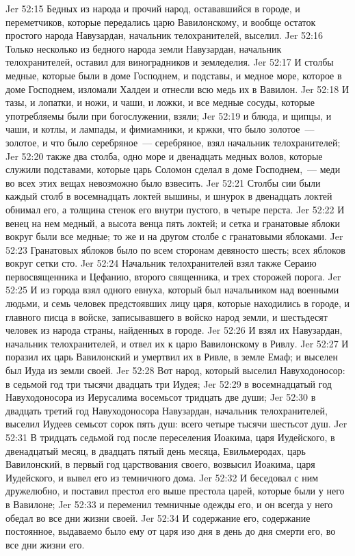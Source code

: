 \vs Jer 52:15 Бедных из народа и прочий народ, остававшийся в городе, и переметчиков, которые передались царю Вавилонскому, и вообще остаток простого народа Навузардан, начальник телохранителей, выселил.
\vs Jer 52:16 Только несколько из бедного народа земли Навузардан, начальник телохранителей, оставил для виноградников и земледелия.
\vs Jer 52:17 И столбы медные, которые были в доме Господнем, и подставы, и медное море, которое в доме Господнем, изломали Халдеи и отнесли всю медь их в Вавилон.
\vs Jer 52:18 И тазы, и лопатки, и ножи, и чаши, и ложки, и все медные сосуды, которые употребляемы были при богослужении, взяли;
\vs Jer 52:19 и блюда, и щипцы, и чаши, и котлы, и лампады, и фимиамники, и кржки, что было золотое~--- золотое, и что было серебряное~--- серебряное, взял начальник телохранителей;
\vs Jer 52:20 также два столба, одно море и двенадцать медных волов, которые служили подставами, которые царь Соломон сделал в доме Господнем,~--- меди во всех этих вещах невозможно было взвесить.
\vs Jer 52:21 Столбы сии были каждый столб в восемнадцать локтей вышины, и шнурок в двенадцать локтей обнимал его, а толщина стенок его внутри пустого, в четыре перста.
\vs Jer 52:22 И венец на нем медный, а высота венца пять локтей; и сетка и гранатовые яблоки вокруг были все медные; то же и на другом столбе с гранатовыми яблоками.
\vs Jer 52:23 Гранатовых яблоков было по всем сторонам девяносто шесть; всех яблоков вокруг сетки сто.
\vs Jer 52:24 Начальник телохранителей взял также Сераию первосвященника и Цефанию, второго священника, и трех сторожей порога.
\vs Jer 52:25 И из города взял одного евнуха, который был начальником над военными людьми, и семь человек предстоявших лицу царя, которые находились в городе, и главного писца в войске, записывавшего в войско народ земли, и шестьдесят человек из народа страны, найденных в городе.
\vs Jer 52:26 И взял их Навузардан, начальник телохранителей, и отвел их к царю Вавилонскому в Ривлу.
\vs Jer 52:27 И поразил их царь Вавилонский и умертвил их в Ривле, в земле Емаф; и выселен был Иуда из земли своей.
\vs Jer 52:28 Вот народ, который выселил Навуходоносор: в седьмой год три тысячи двадцать три Иудея;
\vs Jer 52:29 в восемнадцатый год Навуходоносора из Иерусалима  восемьсот тридцать две души;
\vs Jer 52:30 в двадцать третий год Навуходоносора Навузардан, начальник телохранителей, выселил Иудеев семьсот сорок пять душ: всего четыре тысячи шестьсот душ.
\rsbpar\vs Jer 52:31 В тридцать седьмой год после переселения Иоакима, царя Иудейского, в двенадцатый месяц, в двадцать пятый день месяца, Евильмеродах, царь Вавилонский, в первый год царствования своего, возвысил Иоакима, царя Иудейского, и вывел его из темничного дома.
\vs Jer 52:32 И беседовал с ним дружелюбно, и поставил престол его выше престола царей, которые были у него в Вавилоне;
\vs Jer 52:33 и переменил темничные одежды его, и он всегда у него обедал во все дни жизни своей.
\vs Jer 52:34 И содержание его, содержание постоянное, выдаваемо было ему от царя изо дня в день до дня смерти его, во все дни жизни его.
